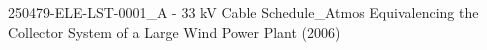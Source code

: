 \renewcommand\bibname{References}

\begin{thebibliography}{99}
	 250479-ELE-LST-0001_A - 33 kV Cable Schedule_Atmos
	 Equivalencing the Collector System of a Large Wind Power Plant (2006)
\end{thebibliography}